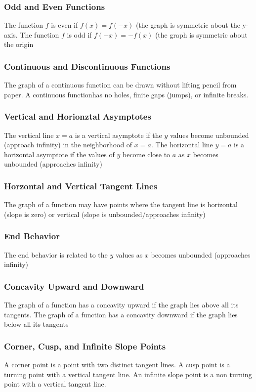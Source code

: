 \documentclass{article}
\begin{document}
	\subsubsection{Odd and Even Functions}
	The function $f$ is even if $f(x)=f(-x)$ (the graph is symmetric about the y-axis. The function $f$ is odd if $f(-x)=-f(x)$ (the graph is symmetric about the origin
	\subsubsection{Continuous and Discontinuous Functions}
	The graph of a continuous function can be drawn without lifting pencil from paper. A continuous functionhas no holes, finite gaps (jumps), or infinite breaks.
	\subsubsection{Vertical and Horionztal Asymptotes}
	The vertical line $x=a$ is a vertical asymptote if the $y$ values become unbounded (approach infinity) in the neighborhood of $x=a$. The horizontal line $y=a$ is a horizontal asymptote if the values of $y$ become close to $a$ as $x$ becomes unbounded (approaches infinity)
	\subsubsection{Horzontal and Vertical Tangent Lines}
	The graph of a function may have points where the tangent line is horizontal (slope is zero) or vertical (slope is unbounded/approaches infinity)
	\subsubsection{End Behavior}
	The end behavior is related to the $y$ values as $x$ becomes unbounded (approaches infinity)
	\subsubsection{Concavity Upward and Downward}
	The graph of a function has a concavity upward if the graph lies above all its tangents. The graph of a function has a concavity downward if the graph lies below all its tangents
	\subsubsection{Corner, Cusp, and Infinite Slope Points}
	A corner point is a point with two distinct tangent lines. A cusp point is a turning point with a vertical tangent line. An infinite slope point is a non turning point with a vertical tangent line.
\end{document}
